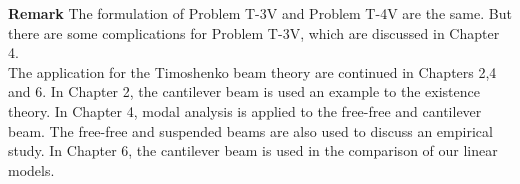 \documentclass[../../main.tex]{subfiles}
\begin{document}
    \textbf{Remark} The formulation of Problem T-3V and Problem T-4V are the same. But there are some complications for Problem T-3V, which are discussed in Chapter 4.\\

    The application for the Timoshenko beam theory are continued in Chapters 2,4 and 6. In Chapter 2, the cantilever beam is used an example to the existence theory. In Chapter 4, modal analysis is applied to the free-free and cantilever beam. The free-free and suspended beams are also used to discuss an empirical study. In Chapter 6, the cantilever beam is used in the comparison of our linear models.
\end{document}
